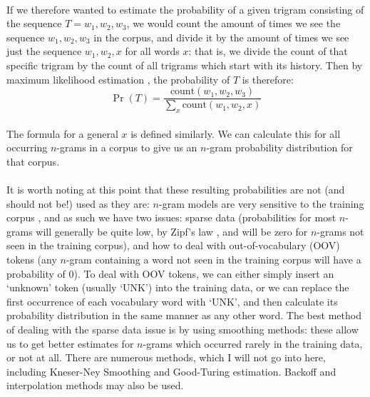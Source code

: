  \paragraph{}{If we therefore wanted to estimate the probability of a
   given trigram consisting of the sequence $T = w_1, w_2, w_3$, we would 
   count the amount of times we see the sequence $w_1, w_2, w_3$ in
   the corpus, and divide it by the amount of times we see just the
   sequence $w_1, w_2, x$ for all words $x$: that is, we divide the
   count of that specific trigram by the count of all trigrams which
   start with its history. Then by maximum likelihood estimation
   \cite{smt}, the probability of $T$ is therefore:
   $$ \Pr(T) = \frac{\text{count}(w_1, w_2, w_3)}
   {\sum_x \text{count} (w_1, w_2, x)}$$ \\The formula for a general
   $x$ is defined similarly. We can calculate this for all occurring
   $n$-grams in a corpus to give us an $n$-gram probability
   distribution for that corpus. }
 \paragraph{}{It is worth noting at this point that these resulting
   probabilities are not (and should not be!) used as they are:
   $n$-gram models are very sensitive to the training corpus
   \cite{jur}, and as such we have two issues: sparse data
   (probabilities for most $n$-grams will generally be quite low, by
   Zipf's law \cite{zipf}, and will be zero for $n$-grams not seen in
   the training corpus), and how to deal with out-of-vocabulary (OOV)
   tokens (any $n$-gram containing a word not seen in the training
   corpus will have a probability of 0). To deal with OOV tokens, we
   can either simply insert an `unknown' token (usually `UNK') into
   the training data, or we can replace the first occurrence of each
   vocabulary word with `UNK', and then calculate its probability
   distribution in the same manner as any other word. The best method
   of dealing with the sparse data issue is by using smoothing
   methods: these allow us to get better estimates for $n$-grams which
   occurred rarely in the training data, or not at all. There are
   numerous methods, which I will not go into here, including
   Kneser-Ney Smoothing and Good-Turing estimation. Backoff and
   interpolation methods may also be used\cite{jur}. }

